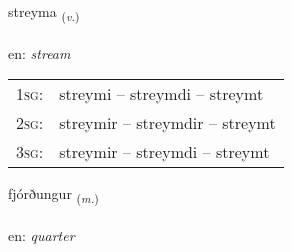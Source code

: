 \documentclass[frontgrid, backgrid]{flacards}\usepackage[]{graphicx}\usepackage[]{xcolor}
\begin{document}
\renewcommand{\flhead}{\vskip5pt \fboxsep=0pt {\small\bfseries\footnotesize Sagnorð | Verb}}
\renewcommand{\fcfoot}{\vskip5pt \fboxsep=0pt \hspace{2pt}{\small\bfseries\footnotesize 3K}}

\renewcommand{\blhead}{\vskip5pt {\small\bfseries\footnotesize Sagnorð | Verb }}
\renewcommand{\bcfoot}{\vskip5pt \hspace{2pt}{\small\bfseries\footnotesize 3K}}


{streyma \small{\textsubscript{(\textit{v.})}} \\[1ex] %
\textphonetic{[streiːma]} \\
en: \emph{stream} \\  [2ex]
\renewcommand*{\arraystretch}{0.8}
\begin{tabular}{p{1cm}l}
\textsc{1sg}: & streymi -- streymdi -- streymt \\ 
\textsc{2sg}: & streymir -- streymdir -- streymt \\ 
\textsc{3sg}: & streymir -- streymdi -- streymt \\ 
\end{tabular}
}

\renewcommand{\flhead}{\vskip5pt \fboxsep=0pt {\small\bfseries\footnotesize Nafnorð | Noun}}
\renewcommand{\fcfoot}{\vskip5pt \fboxsep=0pt \hspace{2pt}{\small\bfseries\footnotesize 3K}}

\renewcommand{\blhead}{\vskip5pt {\small\bfseries\footnotesize Nafnorð | Noun }}
\renewcommand{\bcfoot}{\vskip5pt \hspace{2pt}{\small\bfseries\footnotesize 3K}}


{fjórðungur \small{\textsubscript{(\textit{m.})}} \\[1ex] %
\textphonetic{[fjourðuŋkʏr]} \\
en: \emph{quarter} \\  [2ex]
\renewcommand*{\arraystretch}{0.8}
}
\end{document}
